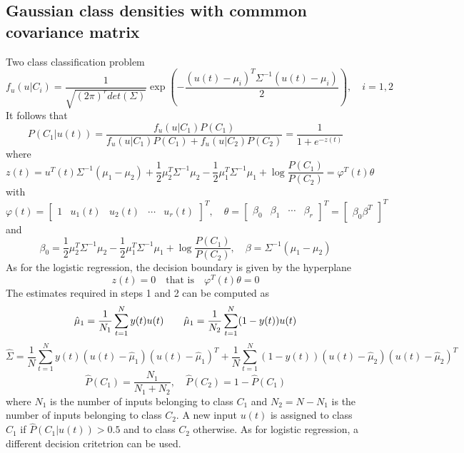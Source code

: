 \documentclass{book}
\theoremstyle{definition}
\theoremstyle{remark}
\theoremstyle{remark}
\begin{document}
\subsection{Gaussian class densities with commmon covariance matrix}
Two class classification problem 
\[
    f_u(u|C_i)=\displaystyle\frac{1}{\sqrt{(2\pi)^rdet(\Sigma)}}\exp \left(-\displaystyle\frac{(u(t)-\mu_i)^T\Sigma^{-1}(u(t)-\mu_i)}{2}\right), \quad i=1,2
\]
It follows that 
\[
    P(C_1|u(t))=\displaystyle\frac{f_u(u|C_1)P(C_1)}{f_u(u|C_1)P(C_1)+f_u(u|C_2)P(C_2)}=\displaystyle\frac{1}{1+e^{-z(t)}}
\]
where
\[
    z(t)=u^T(t)\Sigma^{-1}(\mu_1-\mu_2)+\displaystyle\frac{1}{2}\mu_2^T\Sigma^{-1}\mu_2-\displaystyle\frac{1}{2}\mu_1^T\Sigma^{-1}\mu_1+\log\displaystyle\frac{P(C_1)}{P(C_2)}=\varphi^T(t)\theta
\]
with 
\[
    \varphi(t)=\begin{bmatrix}
        1 & u_1(t) & u_2(t) & \cdots & u_r(t)
    \end{bmatrix}^T, \quad \theta=\begin{bmatrix}
        \beta_0 & \beta_1 & \cdots & \beta_r
    \end{bmatrix}^T=\begin{bmatrix}
        \beta_0 \beta^T
    \end{bmatrix}^T
\]
and
\[
    \beta_0=\displaystyle\frac{1}{2}\mu_2^T\Sigma^{-1}\mu_2-\displaystyle\frac{1}{2}\mu_1^T\Sigma^{-1}\mu_1+\log \displaystyle\frac{P(C_1)}{P(C_2)},\quad \beta=\Sigma^{-1}(\mu_1-\mu_2)
\]
As for the logistic regression, the decision boundary is given by the hyperplane 
\[
    z(t)=0 \quad \text{that is} \quad \varphi^T(t)\theta=0
\]
The estimates required in steps 1 and 2 can be computed as 
\[
    \hat{\mu}_1=\displaystyle\frac{1}{N_1}\displaystyle\sum_{t=1}^{N}y(t)u(t) \qquad \hat{\mu}_1=\displaystyle\frac{1}{N_2}\displaystyle\sum_{t=1}^{N}(1-y(t))u(t)\\
\]
\[
    \hat{\Sigma}=\displaystyle\frac{1}{N}\displaystyle\sum_{t=1}^{N}y(t)(u(t)-\hat{\mu}_1)(u(t)-\hat{\mu}_1)^T+\displaystyle\frac{1}{N}\displaystyle\sum_{t=1}^{N}(1-y(t))(u(t)-\hat{\mu}_2)(u(t)-\hat{\mu}_2)^T
\]
\[
    \hat{P}(C_1)=\displaystyle\frac{N_1}{N_1+N_2},\quad\hat{P}(C_2)=1-\hat{P}(C_1)
\]
where $N_1$ is the number of inputs belonging to class $C_1$ and $N_2=N-N_1$ is the number of inputs belonging to class $C_2$. A new input $u(t)$ is assigned to class $C_1$ if $\hat{P}(C_1|u(t))>0.5$ and to class $C_2$ otherwise. As for logistic regression, a different decision critetrion can be used. 
\end{document}
